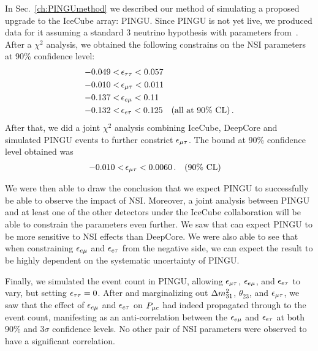 In Sec.~\ref{ch:PINGUmethod} we described our method of simulating a proposed upgrade to the IceCube array: PINGU.
Since PINGU is not yet live, we produced data for it assuming a standard $3$ neutrino hypothesis with parameters from~\cite{nufit}.
After a $\chi^2$ analysis, we obtained the following constrains on the NSI parameters at 90\% confidence level:
\begin{align}
    -0.049 <&\, \epsilon_{\tau\tau} < 0.057 \nonumber \\
    -0.010 <&\, \epsilon_{\mu\tau} < 0.011 \nonumber \\
    -0.137 <&\, \epsilon_{e\mu} < 0.11 \nonumber \\
    -0.132 <&\, \epsilon_{e\tau} < 0.125 \quad (\text{all at }90\% \text{ CL})\,.
 \end{align}
After that, we did a joint $\chi^2$ analysis combining IceCube, DeepCore and simulated PINGU events to further constrict $\epsilon_{\mu\tau}$. The bound at 90\% confidence level obtained was
\begin{align}
    -0.010 <&\, \epsilon_{\mu\tau} < 0.0060\,. \quad (90\% \text{ CL})
 \end{align}

We were then able to draw the conclusion that we expect PINGU to successfully be able to observe the impact of NSI. Moreover, a joint analysis between PINGU and at least one of the other detectors under the IceCube collaboration
will be able to constrain the parameters even further. We saw that can expect PINGU to be more sensitive to NSI effects than DeepCore. We were also able to see that when constraining $\epsilon_{e\mu}$ and $\epsilon_{e\tau}$ from the negative side, 
we can expect the result to be highly dependent on the systematic uncertainty of PINGU.

Finally, we simulated the event count in PINGU, allowing $\epsilon_{\mu\tau}$, $\epsilon_{e\mu}$, and $\epsilon_{e\tau}$ to vary, but setting $\epsilon_{\tau\tau}=0$.
After and marginalizing out $\dm[31]$, $\theta_{23}$, and $\epsilon_{\mu\tau}$, we saw that the effect of $\epsilon_{e\mu}$ and $\epsilon_{e\tau}$ on $P_{\mu e}$ had indeed propagated through to the event count,
manifesting as an anti-correlation between the $\epsilon_{e\mu}$ and $\epsilon_{e\tau}$ at both 90\% and $3\sigma$ confidence levels. No other pair of NSI parameters were observed to have 
a significant correlation.